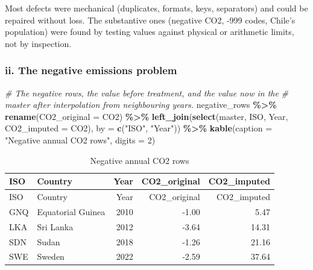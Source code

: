 \documentclass[
]{article}
\newenvironment{Shaded}{\begin{snugshade}}{\end{snugshade}}
\newcommand{\AttributeTok}[1]{\textcolor[rgb]{0.13,0.29,0.53}{#1}}
\newcommand{\CommentTok}[1]{\textcolor[rgb]{0.56,0.35,0.01}{\textit{#1}}}
\newcommand{\DecValTok}[1]{\textcolor[rgb]{0.00,0.00,0.81}{#1}}
\newcommand{\FunctionTok}[1]{\textcolor[rgb]{0.13,0.29,0.53}{\textbf{#1}}}
\newcommand{\NormalTok}[1]{#1}
\newcommand{\SpecialCharTok}[1]{\textcolor[rgb]{0.81,0.36,0.00}{\textbf{#1}}}
\newcommand{\StringTok}[1]{\textcolor[rgb]{0.31,0.60,0.02}{#1}}
\begin{document}
Most defects were mechanical (duplicates, formats, keys, separators) and
could be repaired without loss. The substantive ones (negative CO2, -999
codes, Chile's population) were found by testing values against physical
or arithmetic limits, not by inspection.

\subsubsection{ii. The negative emissions
problem}\label{ii.-the-negative-emissions-problem}

\begin{Shaded}
\begin{Highlighting}[]
\CommentTok{\# The negative rows, the value before treatment, and the value now in the}
\CommentTok{\# master after interpolation from neighbouring years.}
\NormalTok{negative\_rows }\SpecialCharTok{\%\textgreater{}\%}
  \FunctionTok{rename}\NormalTok{(}\AttributeTok{CO2\_original =}\NormalTok{ CO2) }\SpecialCharTok{\%\textgreater{}\%}
  \FunctionTok{left\_join}\NormalTok{(}\FunctionTok{select}\NormalTok{(master, ISO, Year, }\AttributeTok{CO2\_imputed =}\NormalTok{ CO2),}
            \AttributeTok{by =} \FunctionTok{c}\NormalTok{(}\StringTok{"ISO"}\NormalTok{, }\StringTok{"Year"}\NormalTok{)) }\SpecialCharTok{\%\textgreater{}\%}
  \FunctionTok{kable}\NormalTok{(}\AttributeTok{caption =} \StringTok{"Negative annual CO2 rows"}\NormalTok{, }\AttributeTok{digits =} \DecValTok{2}\NormalTok{)}
\end{Highlighting}
\end{Shaded}

\begin{longtable}[]{@{}llrrr@{}}
\caption{Negative annual CO2 rows}\tabularnewline
\toprule\noalign{}
ISO & Country & Year & CO2\_original & CO2\_imputed \\
\midrule\noalign{}
\endfirsthead
\toprule\noalign{}
ISO & Country & Year & CO2\_original & CO2\_imputed \\
\midrule\noalign{}
\endhead
\bottomrule\noalign{}
\endlastfoot
GNQ & Equatorial Guinea & 2010 & -1.00 & 5.47 \\
LKA & Sri Lanka & 2012 & -3.64 & 14.31 \\
SDN & Sudan & 2018 & -1.26 & 21.16 \\
SWE & Sweden & 2022 & -2.59 & 37.64 \\
\end{longtable}
\end{document}
